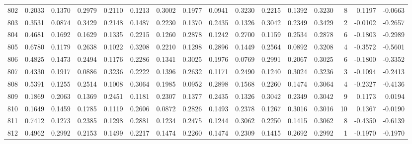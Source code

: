 \begin{tabular}{lrrrrrrrrrrrrrrr}
802 &      0.2033 &  0.1370 &  0.2979 &  0.2110 &  0.1213 &  0.3002 &  0.1977 &  0.0941 &  0.3230 &  0.2215 &   0.1392 &     0.3230 &      8 &                    0.1197 &                    -0.0663 \\
803 &      0.3531 &  0.0874 &  0.3429 &  0.2148 &  0.1487 &  0.2230 &  0.1370 &  0.2435 &  0.1326 &  0.3042 &   0.2349 &     0.3429 &      2 &                   -0.0102 &                    -0.2657 \\
804 &      0.4681 &  0.1692 &  0.1629 &  0.1335 &  0.2215 &  0.1260 &  0.2878 &  0.1242 &  0.2700 &  0.1159 &   0.2534 &     0.2878 &      6 &                   -0.1803 &                    -0.2989 \\
805 &      0.6780 &  0.1179 &  0.2638 &  0.1022 &  0.3208 &  0.2210 &  0.1298 &  0.2896 &  0.1449 &  0.2564 &   0.0892 &     0.3208 &      4 &                   -0.3572 &                    -0.5601 \\
806 &      0.4825 &  0.1473 &  0.2494 &  0.1176 &  0.2286 &  0.1341 &  0.3025 &  0.1976 &  0.0769 &  0.2991 &   0.2067 &     0.3025 &      6 &                   -0.1800 &                    -0.3352 \\
807 &      0.4330 &  0.1917 &  0.0886 &  0.3236 &  0.2222 &  0.1396 &  0.2632 &  0.1171 &  0.2490 &  0.1240 &   0.3024 &     0.3236 &      3 &                   -0.1094 &                    -0.2413 \\
808 &      0.5391 &  0.1255 &  0.2514 &  0.1008 &  0.3064 &  0.1985 &  0.0952 &  0.2898 &  0.1568 &  0.2260 &   0.1474 &     0.3064 &      4 &                   -0.2327 &                    -0.4136 \\
809 &      0.1869 &  0.2063 &  0.1369 &  0.2451 &  0.1181 &  0.2307 &  0.1377 &  0.2435 &  0.1326 &  0.3042 &   0.2349 &     0.3042 &      9 &                    0.1173 &                     0.0194 \\
810 &      0.1649 &  0.1459 &  0.1785 &  0.1119 &  0.2606 &  0.0872 &  0.2826 &  0.1493 &  0.2378 &  0.1267 &   0.3016 &     0.3016 &     10 &                    0.1367 &                    -0.0190 \\
811 &      0.7412 &  0.1273 &  0.2385 &  0.1298 &  0.2881 &  0.1234 &  0.2475 &  0.1244 &  0.3062 &  0.2250 &   0.1415 &     0.3062 &      8 &                   -0.4350 &                    -0.6139 \\
812 &      0.4962 &  0.2992 &  0.2153 &  0.1499 &  0.2217 &  0.1474 &  0.2260 &  0.1474 &  0.2309 &  0.1415 &   0.2692 &     0.2992 &      1 &                   -0.1970 &                    -0.1970 \\

\end{tabular}
